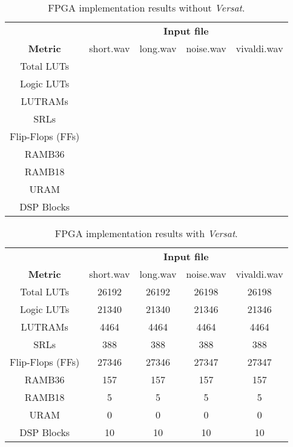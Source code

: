 \documentclass{article}
\begin{document}
\begin{table}[H]
    \centering
    \begin{tabular}{c|c|c|c|c|}
    \cline{2-5}
    \multicolumn{1}{c|}{}  & \multicolumn{4}{c|}{\textbf{Input file}} \\
    \cline{1-5}
    \multicolumn{1}{|c|}{\textbf{Metric}} & short.wav & long.wav & noise.wav & vivaldi.wav \\
    \hline
    \multicolumn{1}{|c|}{Total LUTs} &  &  &  &  \\ 
    \hline
    \multicolumn{1}{|c|}{Logic LUTs}  &  &  &   &  \\ 
    \hline
    \multicolumn{1}{|c|}{LUTRAMs}  &  &  &  &  \\ 
    \hline
    \multicolumn{1}{|c|}{SRLs}  &  &  &  &  \\ 
    \hline
    \multicolumn{1}{|c|}{Flip-Flops (FFs)}  &  &  &  &  \\ 
    \hline
    \multicolumn{1}{|c|}{RAMB36}  &  &  &  &   \\ 
    \hline
    \multicolumn{1}{|c|}{RAMB18}  &  &  &  &  \\ 
    \hline
    \multicolumn{1}{|c|}{URAM}  &  &  &  &  \\ 
    \hline
    \multicolumn{1}{|c|}{DSP Blocks}  &  &  &  &  \\ 
    \hline
    \end{tabular}
    \caption{FPGA implementation results without \textit{Versat}.}
    \label{implementation1}
\end{table}

\begin{table}[H]
    \centering
    \begin{tabular}{c|c|c|c|c|}
    \cline{2-5}
    \multicolumn{1}{c|}{}  & \multicolumn{4}{c|}{\textbf{Input file}} \\
    \cline{1-5}
    \multicolumn{1}{|c|}{\textbf{Metric}} & short.wav & long.wav & noise.wav & vivaldi.wav \\
    \hline
    \multicolumn{1}{|c|}{Total LUTs} & 26192 & 26192 & 26198 & 26198 \\ 
    \hline
    \multicolumn{1}{|c|}{Logic LUTs}  & 21340 & 21340 & 21346  & 21346 \\ 
    \hline
    \multicolumn{1}{|c|}{LUTRAMs}  & 4464 & 4464 & 4464 & 4464 \\ 
    \hline
    \multicolumn{1}{|c|}{SRLs}  & 388 & 388 & 388 & 388 \\ 
    \hline
    \multicolumn{1}{|c|}{Flip-Flops (FFs)}  & 27346 & 27346 & 27347 & 27347 \\ 
    \hline
    \multicolumn{1}{|c|}{RAMB36}  & 157 & 157 & 157 &  157 \\ 
    \hline
    \multicolumn{1}{|c|}{RAMB18}  & 5 & 5 & 5 & 5 \\ 
    \hline
    \multicolumn{1}{|c|}{URAM}  & 0 & 0 & 0 & 0 \\ 
    \hline
    \multicolumn{1}{|c|}{DSP Blocks}  & 10 & 10 & 10 & 10 \\ 
    \hline
    \end{tabular}
    \caption{FPGA implementation results with \textit{Versat}.}
    \label{implementation2}
\end{table}
\end{document}
